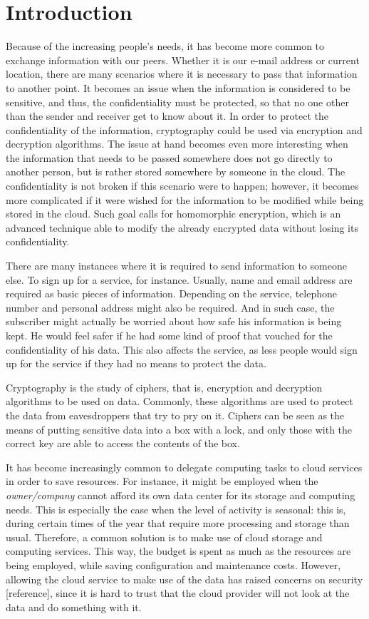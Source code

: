 \chapter{Introduction}
\label{intro}

Because of the increasing people's needs, it has become more common to exchange information with our peers. Whether it is our e-mail address or current location, there are many scenarios where it is necessary to pass that information to another point. It becomes an issue when the information is considered to be sensitive, and thus, the confidentiality must be protected, so that no one other than the sender and receiver get to know about it. In order to protect the confidentiality of the information, cryptography could be used via encryption and decryption algorithms. The issue at hand becomes even more interesting when the information that needs to be passed somewhere does not go directly to another person, but is rather stored somewhere by someone in the cloud. The confidentiality is not broken if this scenario were to happen; however, it becomes more complicated if it were wished for the information to be modified while being stored in the cloud. Such goal calls for homomorphic encryption, which is an advanced technique able to modify the already encrypted data without losing its confidentiality.

There are many instances where it is required to send information to someone else. To sign up for a service, for instance. Usually, name and email address are required as basic pieces of information. Depending on the service, telephone number and personal address might also be required. And in such case, the subscriber might actually be worried about how safe his information is being kept. He would feel safer if he had some kind of proof that vouched for the confidentiality of his data. This also affects the service, as less people would sign up for the service if they had no means to protect the data.

Cryptography is the study of ciphers, that is, encryption and decryption algorithms to be used on data. Commonly, these algorithms are used to protect the data from eavesdroppers that try to pry on it. Ciphers can be seen as the means of putting sensitive data into a box with a lock, and only those with the correct key are able to access the contents of the box.

It has become increasingly common to delegate computing tasks to cloud services in order to save resources. For instance, it might be employed when the \textit{owner/company} cannot afford its own data center for its storage and computing needs. This is especially the case when the level of activity is seasonal: this is, during certain times of the year that require more processing and storage than usual. Therefore, a common solution is to make use of cloud storage and computing services. This way, the budget is spent as much as the resources are being employed, while saving configuration and maintenance costs. However, allowing the cloud service to make use of the data has raised concerns on security [reference], since it is hard to trust that the cloud provider will not look at the data and do something with it.

